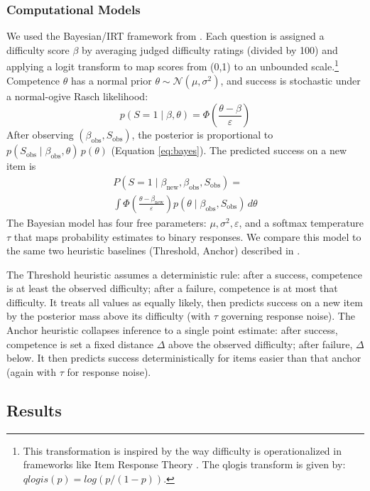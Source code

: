 \documentclass[10pt,letterpaper]{article}
\begin{document}
\subsubsection{Computational Models}\label{computational-models}
We used the Bayesian/IRT framework from \citet{Mercier-2026}. Each question is assigned a difficulty score \(\beta\) by averaging judged difficulty ratings (divided by 100) and applying a logit transform to map scores from (0,1) to an unbounded scale.\footnote{This transformation is inspired by the way difficulty is operationalized in frameworks like Item Response Theory \citep{Rasch-1960}. The qlogis transform is given by: \(qlogis(p) = log(p/(1-p))\).} Competence \(\theta\) has a normal prior \(\theta \sim \mathcal{N}(\mu,\sigma^2)\), and success is stochastic under a normal-ogive Rasch likelihood:
\begin{equation}
p(S=1 \mid \beta,\theta)=\Phi\!\left(\frac{\theta-\beta}{\varepsilon}\right)
\end{equation}
After observing \((\beta_{\text{obs}}, S_{\text{obs}})\), the posterior is proportional to \(p(S_{\text{obs}}\mid \beta_{\text{obs}},\theta)\,p(\theta)\) (Equation \ref{eq:bayes}). The predicted success on a new item is
\begin{multline}
P(S=1 \mid \beta_{\text{new}},\beta_{\text{obs}},S_{\text{obs}})= \\
\int \Phi\!\left(\frac{\theta-\beta_{\text{new}}}{\varepsilon}\right)
p(\theta \mid \beta_{\text{obs}},S_{\text{obs}})\,d\theta
\end{multline}
The Bayesian model has four free parameters: \(\mu,\sigma^2,\varepsilon\), and a softmax temperature \(\tau\) that maps probability estimates to binary responses. We compare this model to the same two heuristic baselines (Threshold, Anchor) described in \citet{Mercier-2026}.

The Threshold heuristic assumes a deterministic rule: after a success, competence is at least the observed difficulty; after a failure, competence is at most that difficulty. It treats all values as equally likely, then predicts success on a new item by the posterior mass above its difficulty (with \(\tau\) governing response noise). The Anchor heuristic collapses inference to a single point estimate: after success, competence is set a fixed distance \(\Delta\) above the observed difficulty; after failure, \(\Delta\) below. It then predicts success deterministically for items easier than that anchor (again with \(\tau\) for response noise).

\subsection{Results}
\end{document}
